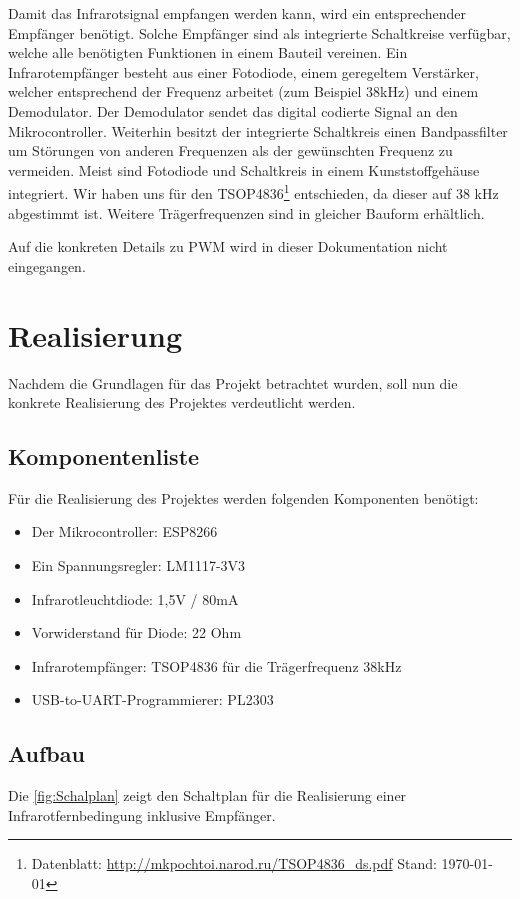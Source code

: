 Damit das Infrarotsignal empfangen werden kann, wird ein entsprechender Empfänger benötigt.
Solche Empfänger sind als integrierte Schaltkreise verfügbar, welche alle benötigten Funktionen in einem Bauteil vereinen.
Ein Infrarotempfänger besteht aus einer Fotodiode, einem geregeltem Verstärker, welcher entsprechend der Frequenz arbeitet (zum Beispiel 38kHz) und einem Demodulator.
Der Demodulator sendet das digital codierte Signal an den Mikrocontroller.
Weiterhin besitzt der integrierte Schaltkreis einen Bandpassfilter um Störungen von anderen Frequenzen als der gewünschten Frequenz zu vermeiden.
Meist sind Fotodiode und Schaltkreis in einem Kunststoffgehäuse integriert.
Wir haben uns für den TSOP4836\footnote{Datenblatt: \url{http://mkpochtoi.narod.ru/TSOP4836_ds.pdf} Stand: \today} entschieden, da dieser auf 38 kHz abgestimmt ist. Weitere Trägerfrequenzen sind in gleicher Bauform erhältlich.

Auf die konkreten Details zu PWM wird in dieser Dokumentation nicht eingegangen.

\section{Realisierung}
Nachdem die Grundlagen für das Projekt betrachtet wurden, soll nun die konkrete Realisierung des Projektes verdeutlicht werden.
\subsection{Komponentenliste}
Für die Realisierung des Projektes werden folgenden Komponenten benötigt:
\begin{itemize}
	\item Der Mikrocontroller: ESP8266
	\item Ein Spannungsregler: LM1117-3V3
	\item Infrarotleuchtdiode: 1,5V / 80mA
	\item Vorwiderstand für Diode: 22 Ohm
	\item Infrarotempfänger: TSOP4836 für die Trägerfrequenz 38kHz
	\item USB-to-UART-Programmierer: PL2303
\end{itemize}


\subsection{Aufbau}
Die \autoref{fig:Schalplan} zeigt den Schaltplan für die Realisierung einer Infrarotfernbedingung inklusive Empfänger.

